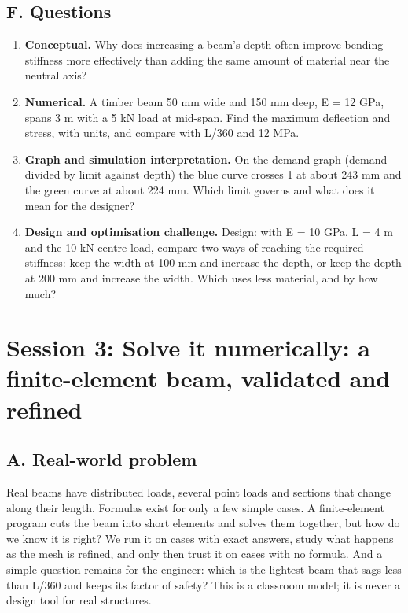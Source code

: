 \documentclass[11pt,a4paper]{article}
\begin{document}
\subsection*{F. Questions}
\begin{enumerate}[nosep]
\item \textbf{Conceptual.} Why does increasing a beam's depth often improve bending stiffness more effectively than adding the same amount of material near the neutral axis?
\item \textbf{Numerical.} A timber beam 50 mm wide and 150 mm deep, E = 12 GPa, spans 3 m with a 5 kN load at mid-span. Find the maximum deflection and stress, with units, and compare with L/360 and 12 MPa.
\item \textbf{Graph and simulation interpretation.} On the demand graph (demand divided by limit against depth) the blue curve crosses 1 at about 243 mm and the green curve at about 224 mm. Which limit governs and what does it mean for the designer?
\item \textbf{Design and optimisation challenge.} Design: with E = 10 GPa, L = 4 m and the 10 kN centre load, compare two ways of reaching the required stiffness: keep the width at 100 mm and increase the depth, or keep the depth at 200 mm and increase the width. Which uses less material, and by how much?
\end{enumerate}

\section{Session 3: Solve it numerically: a finite-element beam, validated and refined}

\subsection*{A. Real-world problem}
Real beams have distributed loads, several point loads and sections that change along their length. Formulas exist for only a few simple cases. A finite-element program cuts the beam into short elements and solves them together, but how do we know it is right? We run it on cases with exact answers, study what happens as the mesh is refined, and only then trust it on cases with no formula. And a simple question remains for the engineer: which is the lightest beam that sags less than L/360 and keeps its factor of safety? This is a classroom model; it is never a design tool for real structures.
\end{document}
